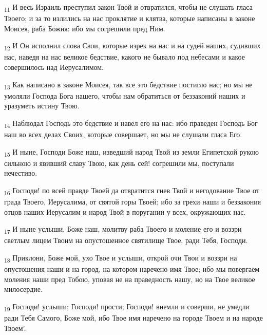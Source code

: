 \begin{tcolorbox}
\textsubscript{11} И весь Израиль преступил закон Твой и отвратился, чтобы не слушать гласа Твоего; и за то излились на нас проклятие и клятва, которые написаны в законе Моисея, раба Божия: ибо мы согрешили пред Ним.
\end{tcolorbox}
\begin{tcolorbox}
\textsubscript{12} И Он исполнил слова Свои, которые изрек на нас и на судей наших, судивших нас, наведя на нас великое бедствие, какого не бывало под небесами и какое совершилось над Иерусалимом.
\end{tcolorbox}
\begin{tcolorbox}
\textsubscript{13} Как написано в законе Моисея, так все это бедствие постигло нас; но мы не умоляли Господа Бога нашего, чтобы нам обратиться от беззаконий наших и уразуметь истину Твою.
\end{tcolorbox}
\begin{tcolorbox}
\textsubscript{14} Наблюдал Господь это бедствие и навел его на нас: ибо праведен Господь Бог наш во всех делах Своих, которые совершает, но мы не слушали гласа Его.
\end{tcolorbox}
\begin{tcolorbox}
\textsubscript{15} И ныне, Господи Боже наш, изведший народ Твой из земли Египетской рукою сильною и явивший славу Твою, как день сей! согрешили мы, поступали нечестиво.
\end{tcolorbox}
\begin{tcolorbox}
\textsubscript{16} Господи! по всей правде Твоей да отвратится гнев Твой и негодование Твое от града Твоего, Иерусалима, от святой горы Твоей; ибо за грехи наши и беззакония отцов наших Иерусалим и народ Твой в поругании у всех, окружающих нас.
\end{tcolorbox}
\begin{tcolorbox}
\textsubscript{17} И ныне услыши, Боже наш, молитву раба Твоего и моление его и воззри светлым лицем Твоим на опустошенное святилище Твое, ради Тебя, Господи.
\end{tcolorbox}
\begin{tcolorbox}
\textsubscript{18} Приклони, Боже мой, ухо Твое и услыши, открой очи Твои и воззри на опустошения наши и на город, на котором наречено имя Твое; ибо мы повергаем моления наши пред Тобою, уповая не на праведность нашу, но на Твое великое милосердие.
\end{tcolorbox}
\begin{tcolorbox}
\textsubscript{19} Господи! услыши; Господи! прости; Господи! внемли и соверши, не умедли ради Тебя Самого, Боже мой, ибо Твое имя наречено на городе Твоем и на народе Твоем'.
\end{tcolorbox}
